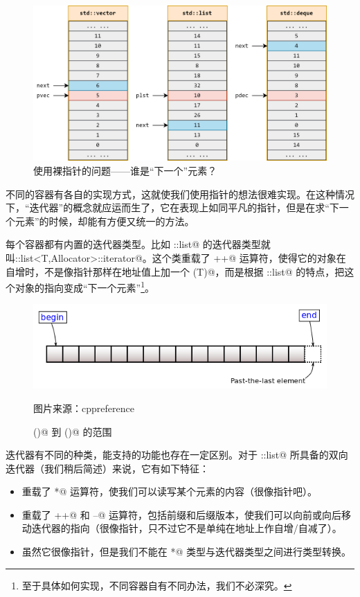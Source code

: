 \begin{figure}[htbp]
    \centering
    \includegraphics[width=\textwidth]{../images/generalized_parts/11_different_types_of_pointer_to_containers.drawio.png}
    \caption{使用裸指针的问题——谁是``下一个''元素？}
\end{figure}
不同的容器有各自的实现方式，这就使我们使用指针的想法很难实现。在这种情况下，``迭代器''的概念就应运而生了，它在表现上如同平凡的指针，但是在求``下一个元素''的时候，却能有方便又统一的方法。\par
每个容器都有内置的迭代器类型。比如 \lstinline@std::list@ 的迭代器类型就叫\newline\lstinline@std::list<T,Allocator>::iterator@。这个类重载了 \lstinline@++@ 运算符，使得它的对象在自增时，不是像指针那样在地址值上加一个 \lstinline@sizeof(T)@，而是根据 \lstinline@std::list@ 的特点，把这个对象的指向变成``下一个元素''\footnote{至于具体如何实现，不同容器自有不同办法，我们不必深究。}。\par
\begin{figure}[htbp]
    \centering
    \includegraphics[width=.8\textwidth]{../images/generalized_parts/11_range_begin_end.png}
    \caption{\lstinline@begin()@ 到 \lstinline@end()@ 的范围}
    \footnotesize{图片来源：cppreference}
\end{figure}
迭代器有不同的种类，能支持的功能也存在一定区别。对于 \lstinline@std::list@ 所具备的双向迭代器（我们稍后简述）来说，它有如下特征：
\begin{itemize}
    \item 重载了 \lstinline@*@ 运算符，使我们可以读写某个元素的内容（很像指针吧）。
    \item 重载了 \lstinline@++@ 和 \lstinline@--@ 运算符，包括前缀和后缀版本，使我们可以向前或向后移动迭代器的指向（很像指针，只不过它不是单纯在地址上作自增/自减了）。
    \item 虽然它很像指针，但是我们不能在 \lstinline@T*@ 类型与迭代器类型之间进行类型转换。
\end{itemize}\par
